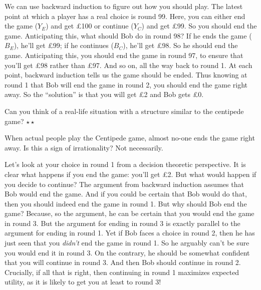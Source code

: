 We can use backward induction to figure out how you should play. The
latest point at which a player has a real choice is round 99. Here,
you can either end the game ($Y_E$) and get £100 or continue ($Y_C$)
and get £99. So you should end the game. Anticipating this, what
should Bob do in round 98? If he ends the game ($B_E$), he'll get £99;
if he continues ($B_C$), he'll get £98. So he should end the
game. Anticipating this, you should end the game in round 97, to
ensure that you'll get £98 rather than £97. And so on, all the way
back to round 1. At each point, backward induction tells us the game
should be ended. Thus knowing at round 1 that Bob will end the game in
round 2, you should end the game right away. So the ``solution'' is
that you will get £2 and Bob gets £0.

\begin{exercise}
  Can you think of a real-life situation with a structure similar to
  the centipede game? $\star\star$
\end{exercise}

When actual people play the Centipede game, almost no-one ends the game
right away. Is this a sign of irrationality? Not necessarily.

Let's look at your choice in round 1 from a decision theoretic
perspective. It is clear what happens if you end the game: you'll get
£2. But what would happen if you decide to continue? The argument from
backward induction assumes that Bob would end the game. And if you
could be certain that Bob would do that, then you should indeed end
the game in round 1. But why should Bob end the game? Because, so the
argument, he can be certain that you would end the game in round
3. But the argument for ending in round 3 is exactly parallel to the
argument for ending in round 1. Yet if Bob faces a choice in round 2,
then he has just seen that you \emph{didn't} end the game in round
1. So he arguably can't be sure you would end it in round 3. On the
contrary, he should be somewhat confident that you will continue in
round 3. And then Bob should continue in round 2. Crucially, if all
that is right, then continuing in round 1 maximizes expected utility,
as it is likely to get you at least to round 3!


